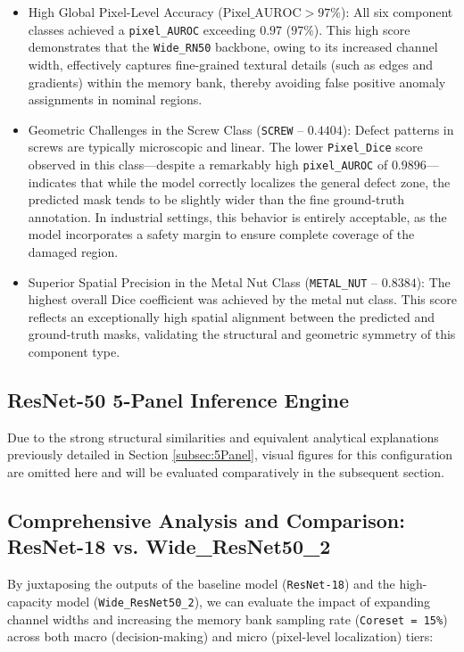 \documentclass{article}
\begin{document}
\begin{itemize}
	\item High Global Pixel-Level Accuracy ($\text{Pixel\_AUROC} > 97\%$): All six component classes achieved a \texttt{pixel\_AUROC} exceeding $0.97$ ($97\%$). This high score demonstrates that the \texttt{Wide\_RN50} backbone, owing to its increased channel width, effectively captures fine-grained textural details (such as edges and gradients) within the memory bank, thereby avoiding false positive anomaly assignments in nominal regions.
	
	\item Geometric Challenges in the Screw Class (\texttt{SCREW} -- $0.4404$): Defect patterns in screws are typically microscopic and linear. The lower \texttt{Pixel\_Dice} score observed in this class—despite a remarkably high \texttt{pixel\_AUROC} of $0.9896$—indicates that while the model correctly localizes the general defect zone, the predicted mask tends to be slightly wider than the fine ground-truth annotation. In industrial settings, this behavior is entirely acceptable, as the model incorporates a safety margin to ensure complete coverage of the damaged region.
	
	\item Superior Spatial Precision in the Metal Nut Class (\texttt{METAL\_NUT} -- $0.8384$): The highest overall Dice coefficient was achieved by the metal nut class. This score reflects an exceptionally high spatial alignment between the predicted and ground-truth masks, validating the structural and geometric symmetry of this component type.
\end{itemize}

\subsection{ResNet-50 5-Panel Inference Engine}
Due to the strong structural similarities and equivalent analytical explanations previously detailed in Section \ref{subsec:5Panel}, visual figures for this configuration are omitted here and will be evaluated comparatively in the subsequent section.


\subsection{Comprehensive Analysis and Comparison: ResNet-18 vs. Wide\_ResNet50\_2}

By juxtaposing the outputs of the baseline model (\texttt{ResNet-18}) and the high-capacity model (\texttt{Wide\_ResNet50\_2}), we can evaluate the impact of expanding channel widths and increasing the memory bank sampling rate (\texttt{Coreset = 15\%}) across both macro (decision-making) and micro (pixel-level localization) tiers:
\end{document}
